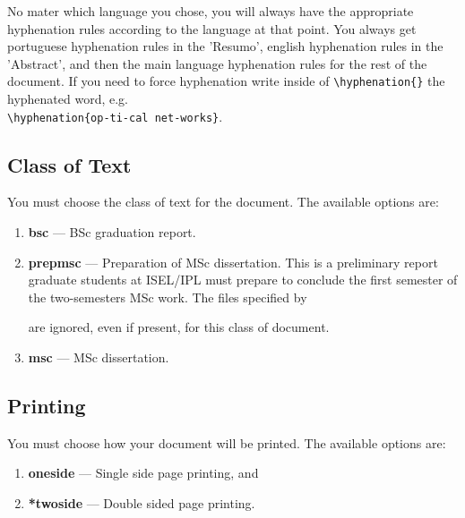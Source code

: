 No mater which language you chose, you will always have the appropriate hyphenation rules according to the language at that point. You always get portuguese hyphenation rules in the 'Resumo', english hyphenation rules in the 'Abstract', and then the main language hyphenation rules for the rest of the document. If you need to force hyphenation write inside of \verb!\hyphenation{}! the hyphenated word, e.g. \\
\verb!\hyphenation{op-ti-cal net-works}!.

\subsection{Class of Text} %
\label{sub:class_of_text}

You must choose the class of text for the document. The available options are:

\begin{enumerate}
    \item \textbf{bsc} --- BSc graduation report.
    \item \textbf{prepmsc} --- Preparation of MSc dissertation. This is a preliminary report graduate students at ISEL/IPL must prepare to conclude the first semester of the two-semesters MSc work. The files specified by
    are ignored, even if present, for this class of document.
    \item \textbf{msc} --- MSc dissertation.
\end{enumerate}
%

\subsection{Printing} %
\label{sub:printing}

You must choose how your document will be printed. The available options are:

\begin{enumerate}
    \item \textbf{oneside} --- Single side page printing, and
    \item \textbf{*twoside} --- Double sided page printing.
\end{enumerate}

